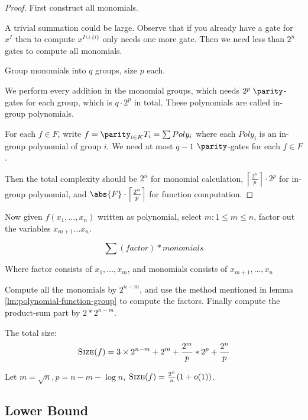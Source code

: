\begin{proof}
First construct all monomials.

A trivial summation could be large. Observe that if you already have a gate for \(x^I\) then to compute \(x^{I \cup \{i\}}\) only needs one more gate. Then we need less than \(2^n\) gates to compute all monomials.

Group monomials into $q$ groups, size $p$ each.

\begin{figure}[ht]
    \centering
    \def\svgwidth{0.75\textwidth}
    
\end{figure}

We perform every addition in the monomial groups, which needs $2^p\;\parity$-gates for each group, which is $q\cdot 2^p$ in total. These polynomials are called in-group polynomials.

For each \(f \in F\), write \(f = \parity_{i \in K} T_i = \sum{Poly_i}\) where each $Poly_i$ is an in-group polynomial of group $i$. We need at most $q-1$ \(\parity\)-gates for each $f \in F$.

Then the total complexity should be $2^n$ for monomial calculation, $\left\lceil \frac{2^n}{p} \right\rceil \cdot 2^p$ for in-group polynomial, and $\abs{F} \cdot \left\lceil \frac{2^n}{p} \right\rceil$ for function computation.
\end{proof}

Now given $f(x_1,\dots,x_n)$ written as polynomial, select $m: 1\le m \le n$, factor out the variables $x_{m+1} \dots x_n$.

$$\sum{(factor)*monomials}$$

Where factor consists of $x_1,\dots,x_m$, and monomials consists of $x_{m+1},\dots,x_n$

Compute all the monomials by \(2^{n-m}\), and use the method mentioned in lemma \ref{lm:polynomial-function-group} to compute the factors. Finally compute the product-sum part by \(2*2^{n-m}\).

The total size:
$$\text{\textsc{Size}}(f) = 3\times 2^{n-m} + 2^m +\frac{2^m}{p}*2^p+\frac{2^{n}}{p}$$

Let $m = \sqrt{n}, p = n-m-\log n$, $\text{\textsc{Size}}(f) = \frac{2^n}{n}(1+o(1))$.

\subsection{Lower Bound}

